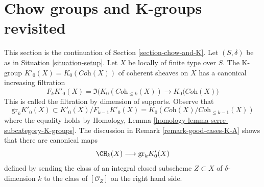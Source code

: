 \section{Chow groups and K-groups revisited}
\label{section-chow-and-K-II}

\noindent
This section is the continuation of Section \ref{section-chow-and-K}.
Let $(S, \delta)$ be as in Situation \ref{situation-setup}.
Let $X$ be locally of finite type over $S$. The K-group
$K'_0(X) = K_0(\textit{Coh}(X))$ of coherent sheaves on $X$
has a canonical increasing filtration
$$
F_kK'_0(X) =
\Im\Big(K_0(\textit{Coh}_{\leq k}(X)) \to K_0(\textit{Coh}(X)\Big)
$$
This is called the filtration by dimension of supports. Observe that
$$
\text{gr}_k K'_0(X) \subset K'_0(X)/F_{k - 1}K'_0(X) =
K_0(\textit{Coh}(X)/\textit{Coh}_{\leq k - 1}(X))
$$
where the equality holds
by Homology, Lemma \ref{homology-lemma-serre-subcategory-K-groups}.
The discussion in Remark \ref{remark-good-cases-K-A} shows
that there are canonical maps
$$
\CH_k(X) \longrightarrow \text{gr}_k K'_0(X)
$$
defined by sending the class of an integral closed subscheme
$Z \subset X$ of $\delta$-dimension $k$ to the class of
$[\mathcal{O}_Z]$ on the right hand side.

